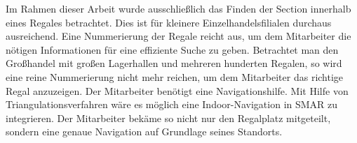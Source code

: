 Im Rahmen dieser Arbeit wurde ausschließlich das Finden der Section innerhalb eines Regales betrachtet. Dies ist für kleinere Einzelhandelsfilialen durchaus ausreichend. Eine Nummerierung der Regale reicht aus, um dem Mitarbeiter die nötigen Informationen für eine effiziente Suche zu geben. Betrachtet man den Großhandel mit großen Lagerhallen und mehreren hunderten Regalen, so wird eine reine Nummerierung nicht mehr reichen, um dem Mitarbeiter das richtige Regal anzuzeigen. Der Mitarbeiter benötigt eine Navigationshilfe. Mit Hilfe von Triangulationsverfahren wäre es möglich eine Indoor-Navigation in \ac{SMAR} zu integrieren. Der Mitarbeiter bekäme so nicht nur den Regalplatz mitgeteilt, sondern eine genaue Navigation auf Grundlage seines Standorts.
%
